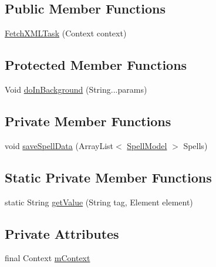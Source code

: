 \subsection*{Public Member Functions}
\begin{DoxyCompactItemize}
\item 
\hyperlink{classorg_1_1buildmlearn_1_1toolkit_1_1learnspelling_1_1data_1_1FetchXMLTask_a8e64e97114cc80eb8df86397ee05cea6}{Fetch\+X\+M\+L\+Task} (Context context)
\end{DoxyCompactItemize}
\subsection*{Protected Member Functions}
\begin{DoxyCompactItemize}
\item 
Void \hyperlink{classorg_1_1buildmlearn_1_1toolkit_1_1learnspelling_1_1data_1_1FetchXMLTask_adb58acd3089cae1c444c6a94a52b4845}{do\+In\+Background} (String...\+params)
\end{DoxyCompactItemize}
\subsection*{Private Member Functions}
\begin{DoxyCompactItemize}
\item 
void \hyperlink{classorg_1_1buildmlearn_1_1toolkit_1_1learnspelling_1_1data_1_1FetchXMLTask_a95c49d317c4deb72c7c524bff0edcc25}{save\+Spell\+Data} (Array\+List$<$ \hyperlink{classorg_1_1buildmlearn_1_1toolkit_1_1learnspelling_1_1data_1_1SpellModel}{Spell\+Model} $>$ Spells)
\end{DoxyCompactItemize}
\subsection*{Static Private Member Functions}
\begin{DoxyCompactItemize}
\item 
static String \hyperlink{classorg_1_1buildmlearn_1_1toolkit_1_1learnspelling_1_1data_1_1FetchXMLTask_abe928f1dd59c4dbe0a4b6468e899a4c2}{get\+Value} (String tag, Element element)
\end{DoxyCompactItemize}
\subsection*{Private Attributes}
\begin{DoxyCompactItemize}
\item 
final Context \hyperlink{classorg_1_1buildmlearn_1_1toolkit_1_1learnspelling_1_1data_1_1FetchXMLTask_a9a1be87cb2925787e06f91e387bfb5c8}{m\+Context}
\end{DoxyCompactItemize}


